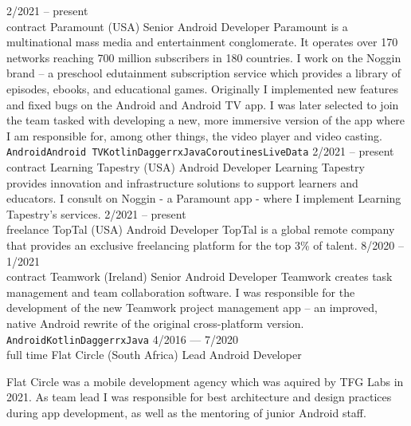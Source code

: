 \documentclass[9pt]{developercv} %
\begin{document}
\begin{entrylist}
	\entry
		{2/2021 -- present\\\footnotesize{contract}}
		{Paramount {\normalfont\small (USA)}}
		{Senior Android Developer}
		{Paramount is a multinational mass media and entertainment conglomerate. It operates over 170 networks reaching 700 million subscribers in 180 countries. I work on the Noggin brand -- a preschool edutainment subscription service which provides a library of episodes, ebooks, and educational games. Originally I implemented new features and fixed bugs on the Android and Android TV app. I was later selected to join the team tasked with developing a new, more immersive version of the app where I am responsible for, among other things, the video player and video casting. \\ \texttt{Android}\slashsep\texttt{Android TV}\slashsep\texttt{Kotlin}\slashsep\texttt{Dagger}\slashsep\texttt{rxJava}\slashsep\texttt{Coroutines}\slashsep\texttt{LiveData}}
	\entry
		{2/2021 -- present\\\footnotesize{contract}}
		{Learning Tapestry {\normalfont\small (USA)}}
		{Android Developer}
		{Learning Tapestry provides innovation and infrastructure solutions to support learners and educators. I consult on Noggin - a Paramount app - where I implement Learning Tapestry's services.}
	\entry
		{2/2021 -- present\\\footnotesize{freelance}}
		{TopTal {\normalfont\small (USA)}}
		{Android Developer}
		{TopTal is a global remote company that provides an exclusive freelancing platform for the top 3\% of talent.}
	\entry
		{8/2020 -- 1/2021\\\footnotesize{contract}}
		{Teamwork {\normalfont\small (Ireland)}}
		{Senior Android Developer}
		{Teamwork creates task management and team collaboration software. I was responsible for the development of the new Teamwork project management app -- an improved, native Android rewrite of the original cross-platform version.\\ \texttt{Android}\slashsep\texttt{Kotlin}\slashsep\texttt{Dagger}\slashsep\texttt{rxJava}}
	\entry
		{4/2016 --- 7/2020\\\footnotesize{full time}}
		{Flat Circle {\normalfont\small (South Africa)}}
		{Lead Android Developer}
		{Flat Circle was a mobile development agency which was aquired by TFG Labs in 2021. As team lead I was responsible for best architecture and design practices during app development, as well as the mentoring of junior Android staff.\vspace{5pt}
		
}
\end{entrylist}
\end{document}
